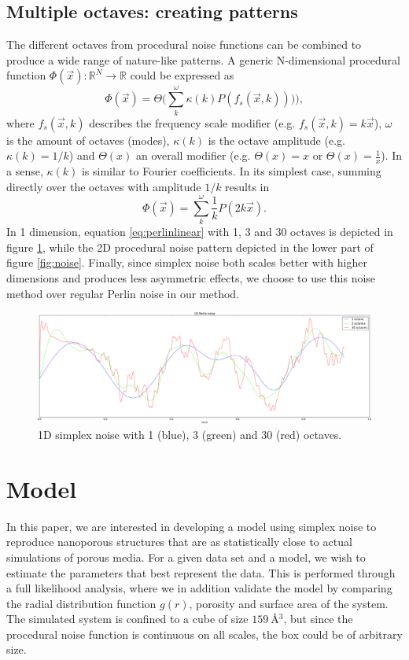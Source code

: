\documentclass[aps,pre,twocolumn,letterpaper,floatfix,showpacs]{revtex4}
\begin{document}
\subsection{Multiple octaves: creating patterns}
\label{sec:octaves}
The different octaves from procedural noise functions can be combined
to produce a wide range of nature-like patterns. A generic
N-dimensional procedural function $\Phi(\vec x): \mathbb R^N \to
\mathbb R$ could be expressed as
\begin{equation}
\label{eq:procedural}
 \Phi(\vec x) = \Theta \Big(\sum_k^\omega \kappa (k) P(  f_s (\vec x,k) )) \Big),
 \end{equation}
where $f_s(\vec x,k)$ describes the frequency scale modifier (e.g. $f_s(\vec x,k) =
k\vec x$), $\omega$ is the amount of octaves (modes), $\kappa(k)$ is the octave amplitude (e.g. $\kappa(k) = 1/k$)
and $\Theta(x)$ an overall modifier (e.g. $\Theta(x) = x$ or
$\Theta(x) = \frac{1}{x}$). In a sense, $\kappa(k)$ is similar to Fourier coefficients. 
In its simplest case, summing directly over the octaves with amplitude $1/k$ results in 
\begin{equation}
\label{eq:perlinlinear}
 \Phi(\vec x) = \sum_k^\omega \frac{1}{k} P( 2k\vec x).
\end{equation}
In 1 dimension, equation \ref{eq:perlinlinear} with 1, 3 and 30 octaves is depicted in figure \ref{fig:1dperlin}, while the 2D procedural noise pattern depicted in the lower
part of figure \ref{fig:noise}. Finally, since simplex noise both scales better with higher dimensions and produces less asymmetric effects, we choose to use this noise method over regular Perlin noise in our method.  

\begin{figure}
\includegraphics[width=.5\textwidth]{1d_perlin.png}
\caption{1D simplex noise with 1 (blue), 3 (green) and 30 (red) octaves. }
\label{fig:1dperlin}
\end{figure}


\section{Model}
In this paper, we are interested in developing a model using simplex noise to reproduce nanoporous structures that are as statistically close to actual simulations of porous media. For a given data set and a model, we wish to estimate the parameters that best represent the data. This is performed through a full likelihood analysis, where we in addition validate the model by comparing the radial distribution function $g(r)$, porosity and surface area of the system. The simulated system is confined to a cube of size $\SI{159}{\angstrom^{3}}$, but since the procedural noise function is continuous on all scales, the box could be of arbitrary size. 
\end{document}
